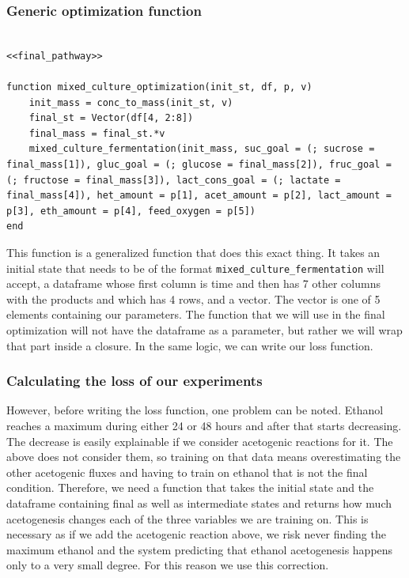 \documentclass[11pt]{article}
\begin{document}
\subsubsection{Generic optimization function}
\label{sec:org0263a04}
\begin{verbatim}

<<final_pathway>>

function mixed_culture_optimization(init_st, df, p, v)
    init_mass = conc_to_mass(init_st, v)
    final_st = Vector(df[4, 2:8])
    final_mass = final_st.*v
    mixed_culture_fermentation(init_mass, suc_goal = (; sucrose = final_mass[1]), gluc_goal = (; glucose = final_mass[2]), fruc_goal = (; fructose = final_mass[3]), lact_cons_goal = (; lactate = final_mass[4]), het_amount = p[1], acet_amount = p[2], lact_amount = p[3], eth_amount = p[4], feed_oxygen = p[5])
end

\end{verbatim}

This function is a generalized function that does this exact thing. It takes an initial state that needs to be of the format \texttt{mixed\_culture\_fermentation} will accept, a dataframe whose first column is time and then has 7 other columns with the products and which has 4 rows, and a vector. The vector is one of 5 elements containing our parameters. The function that we will use in the final optimization will not have the dataframe as a parameter, but rather we will wrap that part inside a closure. In the same logic, we can write our loss function.

\subsubsection{Calculating the loss of our experiments}
\label{sec:orga77d348}
However, before writing the loss function, one problem can be noted. Ethanol reaches a maximum during either 24 or 48 hours and after that starts decreasing. The decrease is easily explainable if we consider acetogenic reactions for it. The above does not consider them, so training on that data means overestimating the other acetogenic fluxes and having to train on ethanol that is not the final condition. Therefore, we need a function that takes the initial state and the dataframe containing final as well as intermediate states and returns how much acetogenesis changes each of the three variables we are training on. This is necessary as if we add the acetogenic reaction above, we risk never finding the maximum ethanol and the system predicting that ethanol acetogenesis happens only to a very small degree. For this reason we use this correction.
\end{document}
